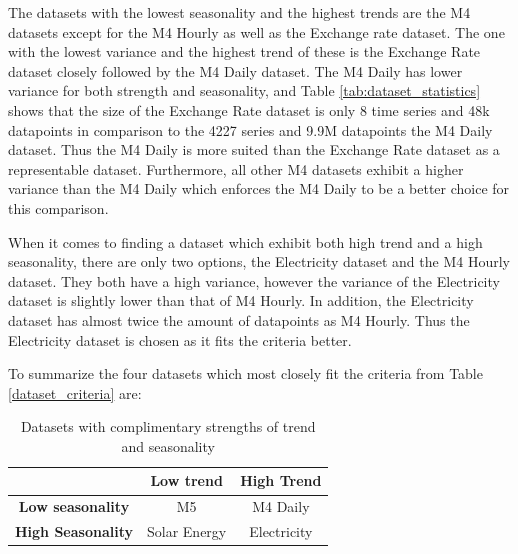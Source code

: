 The datasets with the lowest seasonality and the highest trends are the M4 datasets except for the M4 Hourly as well as the Exchange rate dataset. The one with the lowest variance and the highest trend of these is the Exchange Rate dataset closely followed by the M4 Daily dataset. The M4 Daily has lower variance for both strength and seasonality, and Table \ref{tab:dataset_statistics} shows that the size of the Exchange Rate dataset is only 8 time series and 48k datapoints in comparison to the 4227 series and 9.9M datapoints the M4 Daily dataset. Thus the M4 Daily is more suited than the Exchange Rate dataset as a representable dataset. Furthermore, all other M4 datasets exhibit a higher variance than the M4 Daily which enforces the M4 Daily to be a better choice for this comparison.

When it comes to finding a dataset which exhibit both high trend and a high seasonality, there are only two options, the Electricity dataset and the M4 Hourly dataset. They both have a high variance, however the variance of the Electricity dataset is slightly lower than that of M4 Hourly. In addition, the Electricity dataset has almost twice the amount of datapoints as M4 Hourly. Thus the Electricity dataset is chosen as it fits the criteria better.


To summarize the four datasets which most closely fit the criteria from Table \ref{dataset_criteria} are:

\begin{table}[htp]
  \centering
  \begin{tabular}{ccc}
                              & \textbf{Low trend} & \textbf{High Trend} \\
    \hline
    \textbf{Low seasonality}  & M5                 & M4 Daily            \\
    \hline
    \textbf{High Seasonality} & Solar Energy       & Electricity         \\
  \end{tabular}
  \caption{Datasets with complimentary strengths of trend and seasonality}
  \label{fig:representative_subset_of_datasets}
\end{table}

